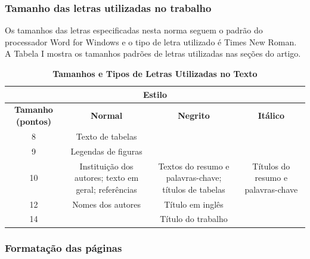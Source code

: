 \documentclass[portugues]{sobraep}
\begin{document}
\subsubsection{Tamanho das letras utilizadas no trabalho}

Os tamanhos das letras especificadas nesta norma seguem o padrão do processador Word for Windows e o tipo de letra utilizado é Times New Roman. A Tabela I mostra os tamanhos padrões de letras utilizadas nas seções do artigo.

\begin{table}[H]
	\centering
	\caption{\textbf{Tamanhos e Tipos de Letras Utilizadas no Texto}}
	\footnotesize
	\setlength{\tabcolsep}{5pt}
	\begin{tabular}{cccc}
		\toprule [1.3pt]	
		\multicolumn{4}{c}{ \textbf{Estilo} } \\
		\hline
		\multirow{2}{1.1cm}{\centering \textbf{Tamanho (pontos)}} & \multirow{2}{*}{\textbf{Normal}} &
		\multirow{2}{*}{\textbf{Negrito}} & \multirow{2}{*}{\textbf{Itálico}} \\
		&  &  & \\		
		\hline
		8 & Texto de tabelas &  &  \\
		\hline
		\multirow{2}{*}{9} & \multirow{2}{2cm}{\centering Legendas de figuras}  &  &  \\
		& & & \\
		\hline
		\multirow{3}{*}{10} &
		\multirow{3}{2cm}{\centering Instituição dos autores; texto em geral; referências}  &
		\multirow{3}{2cm}{\centering Textos do resumo e palavras-chave; títulos de tabelas} &
		\multirow{3}{2.1cm}{\centering Títulos do resumo e palavras-chave} \\
		& &  &  \\
		& &  &  \\
		\hline
		\multirow{2}{*}{12} & \multirow{2}{2cm}{\centering Nomes dos autores}  & \multirow{2}{*}{Título em inglês} &  \\
		& & & \\
		\hline
		14 &  & Título do trabalho & \vspace*{-0.8mm}\\
		\bottomrule[1.3pt]
	\end{tabular} \label{table:TabelaI}
\end{table}

\subsubsection{Formatação das páginas}
\end{document}
